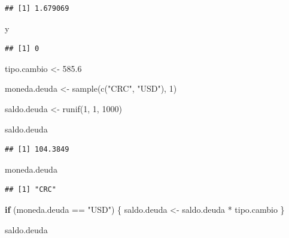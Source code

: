 \documentclass[
  12pt,
]{book}
\newenvironment{Shaded}{\begin{snugshade}}{\end{snugshade}}
\newcommand{\ControlFlowTok}[1]{\textcolor[rgb]{0.13,0.29,0.53}{\textbf{#1}}}
\newcommand{\DecValTok}[1]{\textcolor[rgb]{0.00,0.00,0.81}{#1}}
\newcommand{\FloatTok}[1]{\textcolor[rgb]{0.00,0.00,0.81}{#1}}
\newcommand{\FunctionTok}[1]{\textcolor[rgb]{0.00,0.00,0.00}{#1}}
\newcommand{\NormalTok}[1]{#1}
\newcommand{\OtherTok}[1]{\textcolor[rgb]{0.56,0.35,0.01}{#1}}
\newcommand{\SpecialCharTok}[1]{\textcolor[rgb]{0.00,0.00,0.00}{#1}}
\newcommand{\StringTok}[1]{\textcolor[rgb]{0.31,0.60,0.02}{#1}}
\begin{document}
\begin{verbatim}
## [1] 1.679069
\end{verbatim}

\begin{Shaded}
\begin{Highlighting}[]
\NormalTok{y}
\end{Highlighting}
\end{Shaded}

\begin{verbatim}
## [1] 0
\end{verbatim}

\begin{Shaded}
\begin{Highlighting}[]
\NormalTok{tipo.cambio }\OtherTok{\textless{}{-}} \FloatTok{585.6}

\NormalTok{moneda.deuda }\OtherTok{\textless{}{-}} \FunctionTok{sample}\NormalTok{(}\FunctionTok{c}\NormalTok{(}\StringTok{"CRC"}\NormalTok{, }\StringTok{"USD"}\NormalTok{), }\DecValTok{1}\NormalTok{)}

\NormalTok{saldo.deuda }\OtherTok{\textless{}{-}} \FunctionTok{runif}\NormalTok{(}\DecValTok{1}\NormalTok{, }\DecValTok{1}\NormalTok{, }\DecValTok{1000}\NormalTok{)}

\NormalTok{saldo.deuda}
\end{Highlighting}
\end{Shaded}

\begin{verbatim}
## [1] 104.3849
\end{verbatim}

\begin{Shaded}
\begin{Highlighting}[]
\NormalTok{moneda.deuda}
\end{Highlighting}
\end{Shaded}

\begin{verbatim}
## [1] "CRC"
\end{verbatim}

\begin{Shaded}
\begin{Highlighting}[]
\ControlFlowTok{if}\NormalTok{ (moneda.deuda }\SpecialCharTok{==} \StringTok{"USD"}\NormalTok{) \{}
\NormalTok{  saldo.deuda }\OtherTok{\textless{}{-}}\NormalTok{ saldo.deuda }\SpecialCharTok{*}\NormalTok{ tipo.cambio}
\NormalTok{\}}


\NormalTok{saldo.deuda}
\end{Highlighting}
\end{Shaded}
\end{document}
